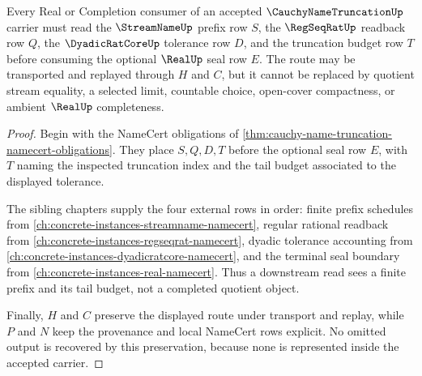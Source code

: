 \begin{theorem}
\label{thm:cauchy-name-truncation-tail-budget-route}
Every Real or Completion consumer of an accepted $\CauchyNameTruncationUp$ carrier must read the $\StreamNameUp$ prefix row $S$, the $\RegSeqRatUp$ readback row $Q$, the $\DyadicRatCoreUp$ tolerance row $D$, and the truncation budget row $T$ before consuming the optional $\RealUp$ seal row $E$. The route may be transported and replayed through $H$ and $C$, but it cannot be replaced by quotient stream equality, a selected limit, countable choice, open-cover compactness, or ambient $\RealUp$ completeness.
\end{theorem}
\begin{proof}
Begin with the NameCert obligations of \autoref{thm:cauchy-name-truncation-namecert-obligations}. They place $S,Q,D,T$ before the optional seal row $E$, with $T$ naming the inspected truncation index and the tail budget associated to the displayed tolerance.

The sibling chapters supply the four external rows in order: finite prefix schedules from \autoref{ch:concrete-instances-streamname-namecert}, regular rational readback from \autoref{ch:concrete-instances-regseqrat-namecert}, dyadic tolerance accounting from \autoref{ch:concrete-instances-dyadicratcore-namecert}, and the terminal seal boundary from \autoref{ch:concrete-instances-real-namecert}. Thus a downstream read sees a finite prefix and its tail budget, not a completed quotient object.

Finally, $H$ and $C$ preserve the displayed route under transport and replay, while $P$ and $N$ keep the provenance and local NameCert rows explicit. No omitted output is recovered by this preservation, because none is represented inside the accepted carrier.
\end{proof}




